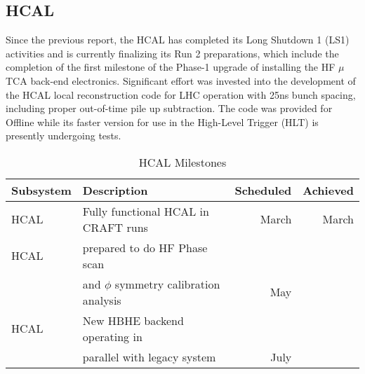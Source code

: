 \subsection{HCAL}
Since the previous report, the HCAL has completed its Long Shutdown 1 (LS1)  activities and is currently finalizing its Run 2 preparations, which include the completion of the first milestone of the Phase-1 upgrade of installing the HF  $\mu$TCA back-end electronics. Significant effort was invested into the development of the HCAL local reconstruction code for LHC operation with 25ns bunch spacing, including proper out-of-time pile up subtraction. The code was provided for Offline while its faster version for use in the High-Level Trigger (HLT) is presently undergoing tests.
\begin{table}[htp]
\caption{HCAL Milestones}
\begin{center}
\begin{tabular}{|l|l|r|r|}
\hline
Subsystem&Description&Scheduled&Achieved\\
\hline
HCAL& Fully functional HCAL in CRAFT runs & March & March\\
\hline
HCAL& prepared to do HF Phase scan & &\\
&and $\phi$ symmetry calibration analysis& May& \\
\hline
HCAL&New HBHE backend operating in& &\\
& parallel with legacy system& July &\\
\hline
\end{tabular}
\end{center}
\label{HCALMilestones}
\end{table}


